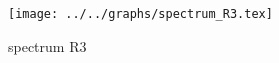 \begin{figure}[h] \centering\texttt{[image: ../../graphs/spectrum\_R3.tex]}\caption{spectrum R3}\label{gr:spectrum_R3} \end{figure}
